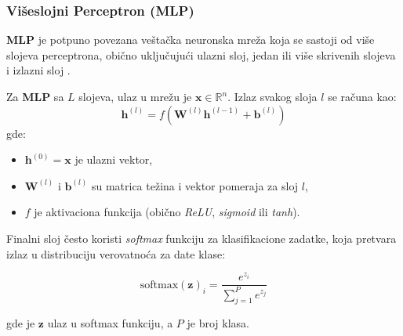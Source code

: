 \documentclass[12pt]{article}
\begin{document}
   \newpage
   \subsubsection*{Višeslojni Perceptron (MLP)}
   \textbf{MLP} je potpuno povezana veštačka neuronska mreža koja se sastoji od više 
   slojeva perceptrona, obično uključujući ulazni sloj, jedan ili više skrivenih slojeva i 
   izlazni sloj \cite{perceptron}.

   Za \textbf{MLP} sa \(L\) slojeva, ulaz u mrežu je \(\mathbf{x} \in \mathbb{R}^n\). 
   Izlaz svakog sloja \(l\) se računa kao:
   \[
   \mathbf{h}^{(l)} = f(\mathbf{W}^{(l)} \mathbf{h}^{(l-1)} + \mathbf{b}^{(l)})
   \]
   gde:
   \vspace{-0.5cm}
   \begin{itemize}
      \item \(\mathbf{h}^{(0)} = \mathbf{x}\) je ulazni vektor,
      \item\(\mathbf{W}^{(l)}\) i \(\mathbf{b}^{(l)}\) su matrica težina i vektor pomeraja za sloj \(l\),
      \item \(f\) je aktivaciona funkcija (obično \textit{ReLU}, \textit{sigmoid} ili \textit{tanh}).
   \end{itemize}

   Finalni sloj često koristi \textit{softmax} funkciju za klasifikacione zadatke, koja pretvara 
   izlaz u distribuciju verovatnoća za date klase:

   \[
   \text{softmax}(\mathbf{z})_i = \frac{e^{z_i}}{\sum_{j=1}^P e^{z_j}}
   \]

   gde je \(\mathbf{z}\) ulaz u softmax funkciju, a \(P\) je broj klasa.
   \vspace{0.5cm}
\end{document}

